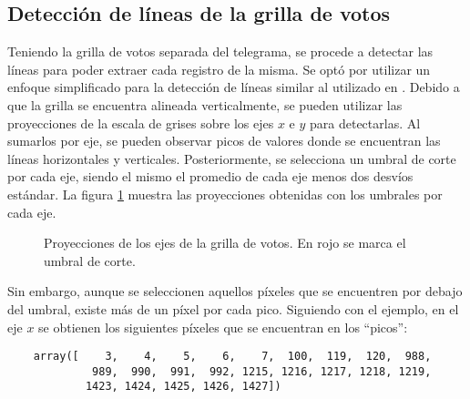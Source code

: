 \subsection{Detección de líneas de la grilla de votos}
Teniendo la grilla de votos separada del telegrama, se procede a detectar las líneas para poder extraer cada registro
de la misma. Se optó por utilizar un enfoque simplificado para la detección de líneas similar al utilizado en \parencite{lamagna2016lectura}. Debido a que la grilla se encuentra alineada verticalmente, se pueden utilizar las
proyecciones de la escala de grises sobre los ejes $x$ e $y$ para detectarlas. Al sumarlos por eje, se pueden observar
picos de valores donde se encuentran las líneas horizontales y verticales. Posteriormente, se selecciona un umbral de
corte por cada eje, siendo el mismo el promedio de cada eje menos dos desvíos estándar. La figura
\ref{fig:etl-3-proyecciones} muestra las proyecciones obtenidas con los umbrales por cada eje.

\begin{figure}[H]
    \centering



    \caption[Proyecciones de los ejes de la grilla de votos]{Proyecciones de los ejes de la grilla de votos. En rojo se marca el umbral de corte.}
    \label{fig:etl-3-proyecciones}
\end{figure}

Sin embargo, aunque se seleccionen aquellos píxeles que se encuentren por debajo del umbral, existe más de un píxel por
cada pico. Siguiendo con el ejemplo, en el eje $x$ se obtienen los siguientes píxeles que se encuentran en los
``picos'':

\begin{verbatim}
    array([    3,    4,    5,    6,    7,  100,  119,  120,  988, 
             989,  990,  991,  992, 1215, 1216, 1217, 1218, 1219, 
            1423, 1424, 1425, 1426, 1427])
\end{verbatim}

